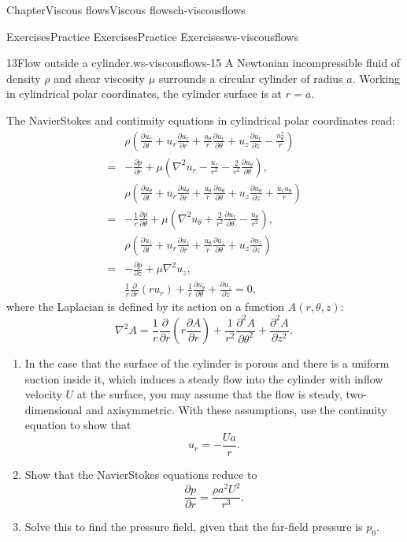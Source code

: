 \documentclass[oneside,10pt,]{book}
\numberwithin{equation}{section}
\newcommand{\pd}[2]{\frac{\partial#1}{\partial#2}}
\begin{document}
\begin{chapterptx}{Chapter}{Viscous flows}{}{Viscous flows}{}{}{ch-viscousflows}
\begin{exercises-section}{Exercises}{Practice Exercises}{}{Practice Exercises}{}{}{ws-viscousflows}
\begin{divisionexercise}{13}{Flow outside a cylinder.}{}{ws-viscousflows-15}
A Newtonian incompressible fluid of density \(\rho\) and shear viscosity \(\mu\) surrounds a circular cylinder of radius \(a\). Working in cylindrical polar coordinates, the cylinder surface is at \(r=a\).%
 \par
The Navier\textendash{}Stokes and continuity equations in cylindrical polar coordinates read:%
\begin{align*}
&\rho\left(\pd{u_r}{t}+u_r\pd{u_r}{r}+\frac{u_{\theta}}{r}\pd{u_r}{\theta}+u_z\pd{u_r}{z}-\frac{u_{\theta}^2}{r}\right)\\
=&-\pd{p}{r}
+\mu\left(\nabla^2u_r-\frac{u_r}{r^2}-\frac{2}{r^2}\pd{u_\theta}{\theta}\right),\\
&\rho\left(\pd{u_{\theta}}{t}+u_r\pd{u_{\theta}}{r}+\frac{u_{\theta}}{r}\pd{u_{\theta}}{\theta}+u_z\pd{u_{\theta}}{z}+\frac{u_ru_{\theta}}{r}\right)\\
=&-\frac{1}{r}\pd{p}{\theta}
+\mu\left(\nabla^2u_\theta+\frac{2}{r^2}\pd{u_r}{\theta}-\frac{u_{\theta}}{r^2}\right),\\
&\rho\left(\pd{u_z}{t}+u_r\pd{u_z}{r}+\frac{u_{\theta}}{r}\pd{u_z}{\theta}+u_z\pd{u_z}{z}\right)\\
=&-\pd{p}{z}
+\mu\nabla^2u_z,\\
&\frac1r\pd{}{r}\left(ru_r\right)+\frac1r\pd{u_\theta}{\theta}+\pd{u_z}{z}=0,
\end{align*}
where the Laplacian is defined by its action on a function \(A(r,\theta,z)\):%
\begin{equation*}
\nabla^2A=\frac1r\pd{}{r}\left(r\pd{A}{r}\right)+\frac1{r^2}\pd{^2A}{\theta^2}+\pd{^2A}{z^2},
\end{equation*}
%
\begin{enumerate}[font=\bfseries,label=(\alph*),ref=\alph*]%
\item{}In the case that the surface of the cylinder is porous and there is a uniform suction inside it, which induces a steady flow into the cylinder with inflow velocity \(U\) at the surface, you may assume that the flow is steady, two-dimensional and axisymmetric. With these assumptions, use the continuity equation to show that%
\begin{equation*}
u_r=-\frac{Ua}{r}.
\end{equation*}
%
\item{}Show that the Navier\textendash{}Stokes equations reduce to%
\begin{equation*}
\pd{p}{r}=\frac{\rho a^2U^2}{r^3}.
\end{equation*}
%
\item{}Solve this to find the pressure field, given that the far-field pressure is \(p_0\).%

\end{enumerate}
\end{divisionexercise}
\end{exercises-section}
\end{chapterptx}
\end{document}

